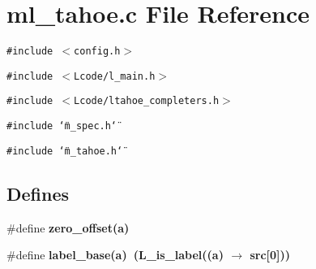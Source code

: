 \section{ml\_\-tahoe.c File Reference}
\label{ml__tahoe_8c}
{\tt \#include $<$config.h$>$}\par
{\tt \#include $<$Lcode/l\_\-main.h$>$}\par
{\tt \#include $<$Lcode/ltahoe\_\-completers.h$>$}\par
{\tt \#include \char`\"{}m\_\-spec.h\char`\"{}}\par
{\tt \#include \char`\"{}m\_\-tahoe.h\char`\"{}}\par
\subsection*{Defines}
\begin{CompactItemize}
\item 
\#define \bf{zero\_\-offset}(a)
\item 
\#define \bf{label\_\-base}(a)~(L\_\-is\_\-label((a) $\rightarrow$ src[0]))
\end{CompactItemize}
